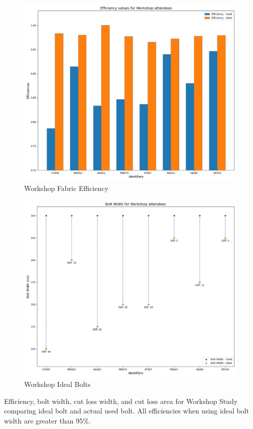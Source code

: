 \begin{figure} [htb]
    \centering
    \includegraphics[width = \textwidth]{Images/Workshop_Eff_bar.png}
    \caption{Workshop Fabric Efficiency}
\end{figure}
\begin{figure} [htb]
    \centering
    \includegraphics[width = \textwidth]{Images/Workshop_BoltWidths_Scatter.png}
    \caption{Workshop Ideal Bolts}
\end{figure}

Efficiency, bolt width, cut loss width, and cut loss area for Workshop Study comparing ideal bolt and actual used bolt. All efficiencies when using ideal bolt width are greater than 95\%.







